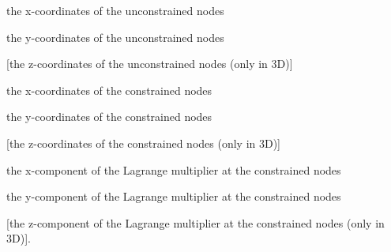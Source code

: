 \begin{DoxyItemize}
\item the x-\/coordinates of the unconstrained nodes
\item the y-\/coordinates of the unconstrained nodes
\item \mbox{[}the z-\/coordinates of the unconstrained nodes (only in 3D)\mbox{]}
\item the x-\/coordinates of the constrained nodes
\item the y-\/coordinates of the constrained nodes
\item \mbox{[}the z-\/coordinates of the constrained nodes (only in 3D)\mbox{]}
\item the x-\/component of the Lagrange multiplier at the constrained nodes
\item the y-\/component of the Lagrange multiplier at the constrained nodes
\item \mbox{[}the z-\/component of the Lagrange multiplier at the constrained nodes (only in 3D)\mbox{]}.

\end{DoxyItemize}
